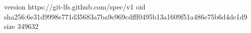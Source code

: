 version https://git-lfs.github.com/spec/v1
oid sha256:6e31d9998e771d35683a7ba9e969cdfff0495b13a1609f51a486e75b6d4de1d9
size 349632

